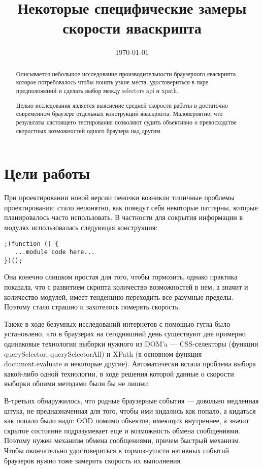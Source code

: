 \documentclass[a4papre,12pt]{article}
\title{Некоторые специфические замеры скорости яваскрипта}
\date{\today}
\begin{document}
\maketitle

\begin{abstract}
Описывается небольшое исследование производительности браузерного
яваскрипта, которое потребовалось чтобы понять узкие места, удостовериться
в паре предположений и сделать выбор между selectors api и xpath.

Целью исследования является выяснение средней скорости работы в достаточно
современном браузере отдельных конструкций яваскрипта. Маловероятно, что
результаты настоящего тестирования позволяют судить объективно о
превосходстве скоростных возможностей одного браузера над другим.
\end{abstract}

\section{Цели работы}

При проектировании новой версии пеночки возникли типичные проблемы
проектирования: стало непонятно, как поведут себя некоторые паттерны,
которые планировалось часто использовать. В частности для сокрытия
информации в модулях использовалась следующая конструкция:

\begin{verbatim}
;(function () {
   ...module code here...
})();
\end{verbatim}

Она конечно слишком простая для того, чтобы тормозить, однако практика
показала, что с развитием скрипта количество возможностей в нем, а значит и
количество модулей, имеет тенденцию переходить все разумные
пределы. Поэтому стало страшно и захотелось померять скорость. 

Также в ходе безумных исследований интернетов с помощью гугла было
установлено, что в браузерах на сегодняшний день существуют две примерно
одинаковые технологии выборки нужного из DOM'a --- CSS-селекторы
(функции querySelector, querySelectorAll) и XPath (в основном функция
document.evaluate и некоторые другие). Автоматически встала проблема выбора
какой-либо одной технологии, в ходе решения которой данные о скорости
выборки обоими методами были бы не лишни.

В-третьих обнаружилось, что родные браузерные события --- довольно
медленная штука, не предназначенная для того, чтобы ими кидались как
попало, а кидаться как попало было надо: OOD помимо объектов, имеющих
внутреннее, а значит скрытое состояние подразумевает еще и возможность
обмена сообщениями. Поэтому нужен механизм обмена сообщениями, причем
быстрый механизм. Чтобы окончательно удостовериться в тормознутости
нативных событий браузеров нужно тоже замерить скорость их выполнения.
\end{document}
